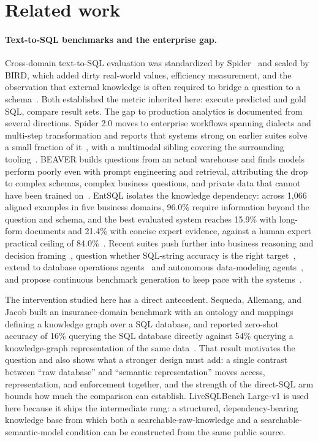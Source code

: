 \section{Related work}
\label{sec:related}

\paragraph{Text-to-SQL benchmarks and the enterprise gap.}
Cross-domain text-to-SQL evaluation was standardized by
Spider~\cite{arxiv-1809-08887} and scaled by BIRD, which added dirty real-world
values, efficiency measurement, and the observation that external knowledge is
often required to bridge a question to a schema~\cite{arxiv-2305-03111}. Both
established the metric inherited here: execute predicted and gold SQL, compare
result sets. The gap to production analytics is documented from several
directions. Spider 2.0 moves to enterprise workflows spanning dialects and
multi-step transformation and reports that systems strong on earlier suites solve
a small fraction of it~\cite{arxiv-2411-07763}, with a multimodal sibling
covering the surrounding tooling~\cite{arxiv-2407-10956}. BEAVER builds questions
from an actual warehouse and finds models perform poorly even with prompt
engineering and retrieval, attributing the drop to complex schemas, complex
business questions, and private data that cannot have been trained
on~\cite{arxiv-2409-02038}. EntSQL isolates the knowledge dependency: across
1,066 aligned examples in five business domains, 96.0\% require information
beyond the question and schema, and the best evaluated system reaches 15.9\% with
long-form documents and 21.4\% with concise expert evidence, against a human
expert practical ceiling of 84.0\%~\cite{arxiv-2606-03363}. Recent suites push
further into business reasoning and decision
framing~\cite{arxiv-2510-07309,arxiv-2606-02109}, question whether SQL-string
accuracy is the right target~\cite{arxiv-2608-09254}, extend to database
operations agents~\cite{arxiv-2607-22165} and autonomous data-modeling
agents~\cite{arxiv-2606-19319}, and propose continuous benchmark generation to
keep pace with the systems~\cite{arxiv-2511-10049}.

The intervention studied here has a direct antecedent. Sequeda, Allemang, and
Jacob built an insurance-domain benchmark with an ontology and mappings defining
a knowledge graph over a SQL database, and reported zero-shot accuracy of 16\%
querying the SQL database directly against 54\% querying a knowledge-graph
representation of the same data~\cite{arxiv-2311-07509}. That result motivates
the question and also shows what a stronger design must add: a single contrast
between ``raw database'' and ``semantic representation'' moves access,
representation, and enforcement together, and the strength of the direct-SQL arm
bounds how much the comparison can establish. LiveSQLBench Large-v1 is used here because it
ships the intermediate rung: a structured, dependency-bearing knowledge base from
which both a searchable-raw-knowledge and a searchable-semantic-model condition
can be constructed from the same public source.

